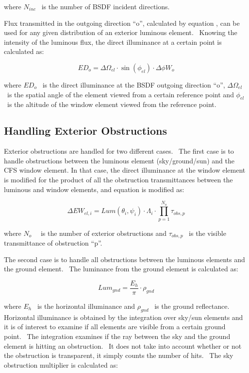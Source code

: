 where \({N_{inc}}\) ~is the number of BSDF incident directions.

Flux transmitted in the outgoing direction ``o'', calculated by equation , can be used for any given distribution of an exterior luminous element.~ Knowing the intensity of the luminous flux, the direct illuminance at a certain point is calculated as:

\begin{equation}
E{D_o} = \Delta {\Omega_{el}} \cdot \sin ({\phi_{el}}) \cdot \Delta \phi {W_o}
\end{equation}

where \(E{D_o}\) ~is the direct illuminance at the BSDF outgoing direction ``o'', \(\Delta {\Omega_{el}}\) ~is the spatial angle of the element viewed from a certain reference point and \({\phi_{el}}\) ~is the altitude of the window element viewed from the reference point.

\subsection{Handling Exterior Obstructions}\label{handling-exterior-obstructions}

Exterior obstructions are handled for two different cases.~ The first case is to handle obstructions between the luminous element (sky/ground/sun) and the CFS window element. In that case, the direct illuminance at the window element is modified for the product of all the obstruction transmittances between the luminous and window elements, and equation is modified as:

\begin{equation}
\Delta E{W_{el,i}} = Lum({\theta_i},{\psi_i}) \cdot {\Lambda_i} \cdot \prod\limits_{p = 1}^{{N_o}} {{\tau_{obs,p}}}
\end{equation}

where \({N_o}\) ~~is the number of exterior obstructions and \({\tau_{obs,p}}\) ~is the visible transmittance of obstruction ``p''.

The second case is to handle all obstructions between the luminous elements and the ground element.~ The luminance from the ground element is calculated as:

\begin{equation}
Lu{m_{gnd}} = \frac{{{E_h}}}{\pi } \cdot {\rho_{gnd}}
\end{equation}

where \({E_h}\) ~is the horizontal illuminance and \({\rho_{gnd}}\) ~is the ground reflectance.~ Horizontal illuminance is obtained by the integration over sky/sun elements and it is of interest to examine if all elements are visible from a certain ground point.~ The integration examines if the ray between the sky and the ground element is hitting an obstruction.~ It does not take into account whether or not the obstruction is transparent, it simply counts the number of hits.~ The sky obstruction multiplier is calculated as:

